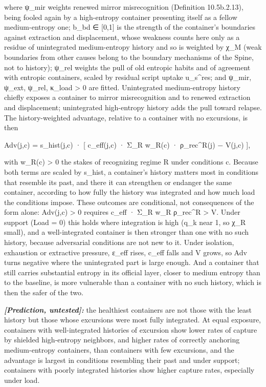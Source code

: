 \documentclass[
]{article}
\begin{document}
where ψ\_mir weights renewed mirror misrecognition (Definition
10.5b.2.13), being fooled again by a high-entropy container presenting
itself as a fellow medium-entropy one; b\_bd ∈ {[}0,1{]} is the strength
of the container's boundaries against extraction and displacement, whose
weakness counts here only as a residue of unintegrated medium-entropy
history and so is weighted by χ\_M (weak boundaries from other causes
belong to the boundary mechanisms of the Spine, not to history); ψ\_rel
weights the pull of old entropic habits and of agreement with entropic
containers, scaled by residual script uptake u\_s\^{}res; and ψ\_mir,
ψ\_ext, ψ\_rel, κ\_load \textgreater{} 0 are fitted. Unintegrated
medium-entropy history chiefly exposes a container to mirror
misrecognition and to renewed extraction and displacement; unintegrated
high-entropy history adds the pull toward relapse. The history-weighted
advantage, relative to a container with no excursions, is then

Adv(j,c) = s\_hist(j,c) · {[} c\_eff(j,c) · Σ\_R w\_R(c) ·
ρ\_rec\^{}R(j) − V(j,c) {]},

with w\_R(c) \textgreater{} 0 the stakes of recognizing regime R under
conditions c. Because both terms are scaled by s\_hist, a container's
history matters most in conditions that resemble its past, and there it
can strengthen or endanger the same container, according to how fully
the history was integrated and how much load the conditions impose.
These outcomes are conditional, not consequences of the form alone:
Adv(j,c) \textgreater{} 0 requires c\_eff · Σ\_R w\_R ρ\_rec\^{}R
\textgreater{} V. Under support (Load = 0) this holds where integration
is high (q\_k near 1, so χ\_R small), and a well-integrated container is
then stronger than one with no such history, because adversarial
conditions are not new to it. Under isolation, exhaustion or extractive
pressure, ε\_eff rises, c\_eff falls and V grows, so Adv turns negative
where the unintegrated part is large enough. And a container that still
carries substantial entropy in its official layer, closer to medium
entropy than to the baseline, is more vulnerable than a container with
no such history, which is then the safer of the two.

\emph{\textbf{{[}Prediction, untested{]}:}} the healthiest containers
are not those with the least history but those whose excursions were
most fully integrated. At equal exposure, containers with
well-integrated histories of excursion show lower rates of capture by
shielded high-entropy neighbors, and higher rates of correctly anchoring
medium-entropy containers, than containers with few excursions, and the
advantage is largest in conditions resembling their past and under
support; containers with poorly integrated histories show higher capture
rates, especially under load.
\end{document}
